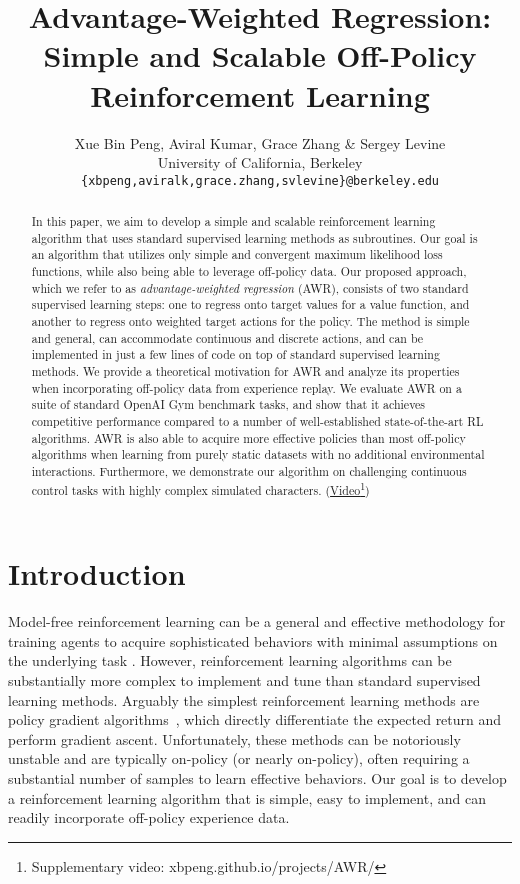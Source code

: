 \documentclass{article} \usepackage{iclr2020_conference,times}
\title{Advantage-Weighted Regression: Simple and Scalable Off-Policy Reinforcement Learning}
\author{Xue Bin Peng, Aviral Kumar, Grace Zhang \& Sergey Levine \\
University of California, Berkeley\\
\texttt{\{xbpeng,aviralk,grace.zhang,svlevine\}@berkeley.edu}
}
\begin{document}
\maketitle

\begin{abstract}
In this paper, we aim to develop a simple and scalable reinforcement learning algorithm that uses standard supervised learning methods as subroutines. Our goal is an algorithm that utilizes only simple and convergent maximum likelihood loss functions, while also being able to leverage off-policy data. Our proposed approach, which we refer to as \textit{advantage-weighted regression} (AWR), consists of two standard supervised learning steps: one to regress onto target values for a value function, and another to regress onto weighted target actions for the policy. The method is simple and general, can accommodate continuous and discrete actions, and can be implemented in just a few lines of code on top of standard supervised learning methods. We provide a theoretical motivation for AWR and analyze its properties when incorporating off-policy data from experience replay. We evaluate AWR on a suite of standard OpenAI Gym benchmark tasks, and show that it achieves competitive performance compared to a number of well-established state-of-the-art RL algorithms. AWR is also able to acquire more effective policies than most off-policy algorithms when learning from purely static datasets with no additional environmental interactions. Furthermore, we demonstrate our algorithm on challenging continuous control tasks with highly complex simulated characters. (\href{https://xbpeng.github.io/projects/AWR/}{Video\footnote{\label{ft:website}Supplementary video: \href{https://xbpeng.github.io/projects/AWR/}{xbpeng.github.io/projects/AWR/}}})
\end{abstract}

\section{Introduction}
Model-free reinforcement learning can be a general and effective methodology for training agents to acquire sophisticated behaviors with minimal assumptions on the underlying task \citep{mnih2015humanlevel,HeessTSLMWTEWER17,Pathak2017}.
However, reinforcement learning algorithms can be substantially more complex to implement and tune than standard supervised learning methods. Arguably the simplest reinforcement learning methods are policy gradient algorithms~\citep{PoliGrad1999}, which directly differentiate the expected return and perform gradient ascent. Unfortunately, these methods can be notoriously unstable and are typically on-policy (or nearly on-policy), often requiring a substantial number of samples to learn effective behaviors.
Our goal is to develop a reinforcement learning algorithm that is simple, easy to implement, and can readily incorporate off-policy experience data.
\end{document}

